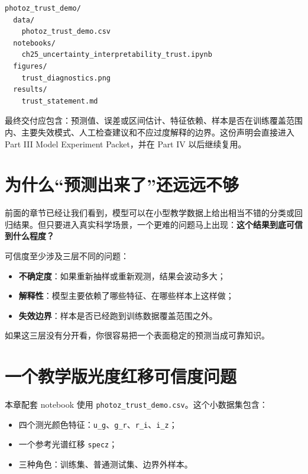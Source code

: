 \begin{examplebox}[最小可信度项目结构]
\begin{lstlisting}[style=terminal]
photoz_trust_demo/
  data/
    photoz_trust_demo.csv
  notebooks/
    ch25_uncertainty_interpretability_trust.ipynb
  figures/
    trust_diagnostics.png
  results/
    trust_statement.md
\end{lstlisting}
\end{examplebox}

最终交付应包含：预测值、误差或区间估计、特征依赖、样本是否在训练覆盖范围内、主要失效模式、人工检查建议和不应过度解释的边界。这份声明会直接进入 Part III Model Experiment Packet，并在 Part IV 以后继续复用。

\section{为什么“预测出来了”还远远不够}

前面的章节已经让我们看到，模型可以在小型教学数据上给出相当不错的分类或回归结果。但只要进入真实科学场景，一个更难的问题马上出现：\textbf{这个结果到底可信到什么程度？}

可信度至少涉及三层不同的问题：

\begin{itemize}
    \item \textbf{不确定度}：如果重新抽样或重新观测，结果会波动多大；
    \item \textbf{解释性}：模型主要依赖了哪些特征、在哪些样本上这样做；
    \item \textbf{失效边界}：样本是否已经跑到训练数据覆盖范围之外。
\end{itemize}

如果这三层没有分开看，你很容易把一个表面稳定的预测当成可靠知识。

\section{一个教学版光度红移可信度问题}

本章配套 notebook 使用 \nolinkurl{photoz_trust_demo.csv}。这个小数据集包含：

\begin{itemize}
    \item 四个测光颜色特征：\texttt{u\_g}、\texttt{g\_r}、\texttt{r\_i}、\texttt{i\_z}；
    \item 一个参考光谱红移 \texttt{specz}；
    \item 三种角色：训练集、普通测试集、边界外样本。
\end{itemize}

